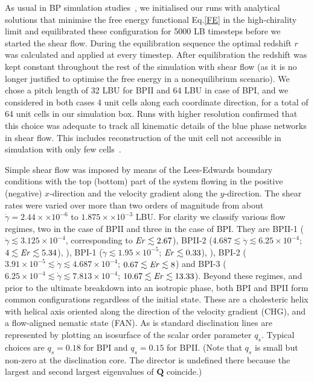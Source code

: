 \documentclass[8.5pt,twoside,twocolumn]{article}
\newcommand{\e}[1]{\times10^{#1}}
\newcommand{\gd}{\dot{\gamma}}
\begin{document}
As usual in BP simulation studies~\cite{Henrich:2011a,Henrich:2010b}, we initialised our runs with 
analytical solutions that minimise the free energy functional Eq.\ref{FE} in the high-chirality limit 
and equilibrated these configuration for 5000 LB timesteps before we started the shear flow. 
During the equilibration sequence the optimal redshift $r$ was calculated and applied at every timestep.
After equilibration the redshift was kept constant throughout the rest of the simulation with shear flow (as 
it is no longer justified to optimise the free energy in a nonequilibrium scenario).
We chose a pitch length of 32 LBU for BPII and 64 LBU in case of BPI, and we considered in both cases 
4 unit cells along each coordinate direction, for a total of 64 unit cells in our simulation box.
Runs with higher resolution confirmed that this choice was adequate to track  
all kinematic details of the blue phase networks in shear flow. This includes
reconstruction of the unit cell not accessible in simulation with only
few cells~\cite{Dupuis:2005}.

Simple shear flow was imposed by means of the Lees-Edwards boundary
conditions with
the top (bottom) part of the system flowing in the positive (negative) $x$-direction and the 
velocity gradient along the $y$-direction.
The shear rates were varied over more than two orders of magnitude from about 
$\gd=2.44\times \e{-6}$ to $1.875\times\e{-3}$ LBU.
For clarity we classify various flow regimes, two in the case of BPII and three in the 
case of BPI. 
They are BPII-1 ($\gd \lesssim 3.125\e{-4}$, corresponding to ${\it Er} \lesssim 2.67$), 
BPII-2 ($4.687\lesssim \gd\lesssim 6.25\e{-4}$; $4\lesssim {\it Er} \lesssim 5.34$), ),
BPI-1 ($\gd \lesssim 1.95\e{-5}$; ${\it Er} \lesssim 0.33$), ), BPI-2 ($3.91\e{-5}\lesssim \gd \lesssim 4.687\e{-4}$; $0.67\lesssim {\it Er} \lesssim 8$) and BPI-3 ($6.25\e{-4}\lesssim \gd\lesssim 7.813\e{-4}$; $10.67 \lesssim {\it Er} \lesssim 13.33$).
Beyond these regimes, and prior to the ultimate breakdown into an isotropic phase, 
both BPI and BPII form common configurations regardless 
of the initial state. These are a cholesteric helix with helical axis 
oriented along the direction of the velocity gradient (CHG), 
and a flow-aligned nematic state (FAN).  
As is standard \cite{Henrich:2010b,Henrich:2012b} disclination lines are represented by plotting an isosurface of the scalar order parameter $q_s$. 
Typical choices are $q_s=0.18$ for BPI and $q_s=0.15$ for BPII.
(Note that $q_s$ is small but non-zero at the disclination core. The director is undefined there because the largest and second largest eigenvalues of ${\mathbf Q}$ coincide.)
\end{document}

